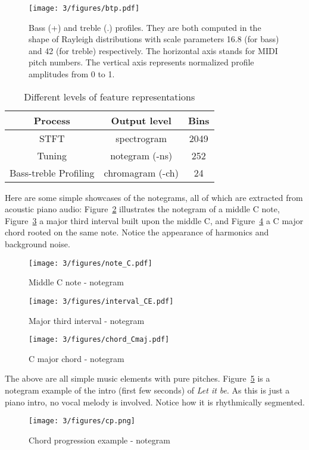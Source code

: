 \begin{figure}[htb]
\centering
\texttt{[image: 3/figures/btp.pdf]}
\caption{Bass (+) and treble (.) profiles. They are both computed in the shape of Rayleigh distributions with scale parameters 16.8 (for bass) and 42 (for treble) respectively. The horizontal axis stands for MIDI pitch numbers. The vertical axis represents normalized profile amplitudes from 0 to 1.}
\label{fig:3-btprofile}
\end{figure}

\begin{table}[htb]
\centering
\footnotesize
\begin{tabular}{|c|c|c|} \hline
 Process & Output level & Bins \\ \hline
 STFT & spectrogram & 2049 \\ \hline
 Tuning & notegram (-ns) & 252 \\ \hline
 Bass-treble Profiling & chromagram (-ch) & 24 \\ \hline
\end{tabular}
\caption{Different levels of feature representations}
\label{tab:3-felevels}
\end{table}

Here are some simple showcases of the notegrams, all of which are extracted from acoustic piano audio: Figure~\ref{fig:3-note_C} illustrates the notegram of a middle C note, Figure~\ref{fig:3-interval_CE} a major third interval built upon the middle C, and Figure~\ref{fig:3-chord_Cmaj} a C major chord rooted on the same note. Notice the appearance of harmonics and background noise.

\begin{figure}
\centering
\texttt{[image: 3/figures/note\_C.pdf]}
\caption{Middle C note - notegram}
\label{fig:3-note_C}
\end{figure}

\begin{figure}
\centering
\texttt{[image: 3/figures/interval\_CE.pdf]}
\caption{Major third interval - notegram}
\label{fig:3-interval_CE}
\end{figure}

\begin{figure}
\centering
\texttt{[image: 3/figures/chord\_Cmaj.pdf]}
\caption{C major chord - notegram}
\label{fig:3-chord_Cmaj}
\end{figure}

The above are all simple music elements with pure pitches. Figure~\ref{fig:3-cp} is a notegram example of the intro (first few seconds) of {\it Let it be}. As this is just a piano intro, no vocal melody is involved. Notice how it is rhythmically segmented.
\begin{figure}
\centering
\texttt{[image: 3/figures/cp.png]}
\caption{Chord progression example - notegram}
\label{fig:3-cp}
\end{figure}

